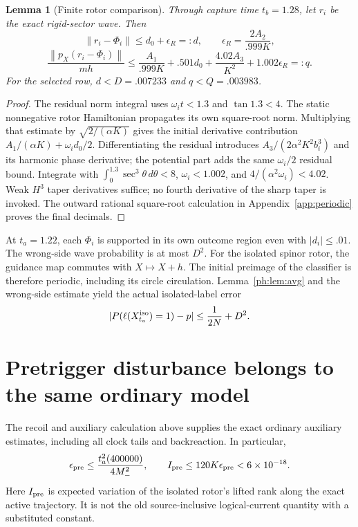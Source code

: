 \documentclass[11pt]{article}
\newtheorem{lemma}[theorem]{Lemma}
\theoremstyle{definition}\newtheorem{definition}[theorem]{Definition}
\theoremstyle{remark}\newtheorem{remark}[theorem]{Remark}
\newcommand{\norm}[1]{\left\lVert#1\right\rVert}
\begin{document}
\begin{lemma}[Finite rotor comparison]\label{ph:lem:rotor}
Through capture time $t_b=1.28$, let $r_i$ be the exact rigid-sector wave. Then
\[
 \norm{r_i-\Phi_i}\le d_0+\epsilon_R=:d,
 \qquad \epsilon_R=\frac{2A_2}{.999K},
\]
\[
 \frac{\norm{p_X(r_i-\Phi_i)}}{mh}
 \le \frac{A_1}{.999K}+.501d_0+\frac{4.02A_3}{K^2}
                +1.002\epsilon_R=:q.
\]
For the selected row, $d<D=.007233$ and $q<Q=.003983$.
\end{lemma}
\begin{proof}
The residual norm integral uses $\omega_it<1.3$ and $\tan1.3<4$. The static nonnegative rotor Hamiltonian propagates its own square-root norm. Multiplying that estimate by $\sqrt{2/(\alpha K)}$ gives the initial derivative contribution $A_1/(\alpha K)+\omega_i d_0/2$. Differentiating the residual introduces $A_3/(2\alpha^2K^2b_i^3)$ and its harmonic phase derivative; the potential part adds the same $\omega_i/2$ residual bound. Integrate with $\int_0^{1.3}\sec^3\theta\,d\theta<8$, $\omega_i<1.002$, and $4/(\alpha^2\omega_i)<4.02$. Weak $H^3$ taper derivatives suffice; no fourth derivative of the sharp taper is invoked. The outward rational square-root calculation in Appendix~\ref{app:periodic}
proves the final decimals.
\end{proof}

At $t_a=1.22$, each $\Phi_i$ is supported in its own outcome region even with $|d_i|\le.01$. The wrong-side wave probability is at most $D^2$. For the isolated spinor rotor, the guidance map commutes with $X\mapsto X+h$. The initial preimage of the classifier is therefore periodic, including its circle circulation. Lemma~\ref{ph:lem:avg} and the wrong-side estimate yield the actual isolated-label error
\[
 |P(\ell(X^{\rm iso}_{t_a})=1)-p|\le\frac1{2N}+D^2.
\]

\section{Pretrigger disturbance belongs to the same ordinary model}
The recoil and auxiliary calculation above supplies the exact ordinary auxiliary estimates, including all clock tails and backreaction. In particular,
\[
 \epsilon_{\rm pre}\le\frac{t_a^2(400000)}{4M_-^2},\qquad
 I_{\rm pre}\le120K\epsilon_{\rm pre}<6\times10^{-18}.
\]
Here $I_{\rm pre}$ is expected variation of the isolated rotor's lifted rank along the exact active trajectory. It is not the old source-inclusive logical-current quantity with a substituted constant.
\end{document}
